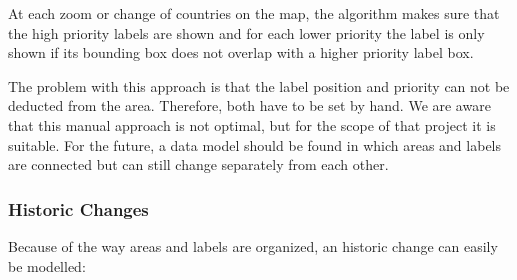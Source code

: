 At each zoom or change of countries on the map, the algorithm makes sure that the high priority labels are shown and for each lower priority the label is only shown if its bounding box does not overlap with a higher priority label box.

The problem with this approach is that the label position and priority can not be deducted from the area. Therefore, both have to be set by hand. We are aware that this manual approach is not optimal, but for the scope of that project it is suitable. For the future, a data model should be found in which areas and labels are connected but can still change separately from each other.



\subsubsection{Historic Changes} %
\label{ssub:historic_changes}
Because of the way areas and labels are organized, an historic change can easily be modelled:


